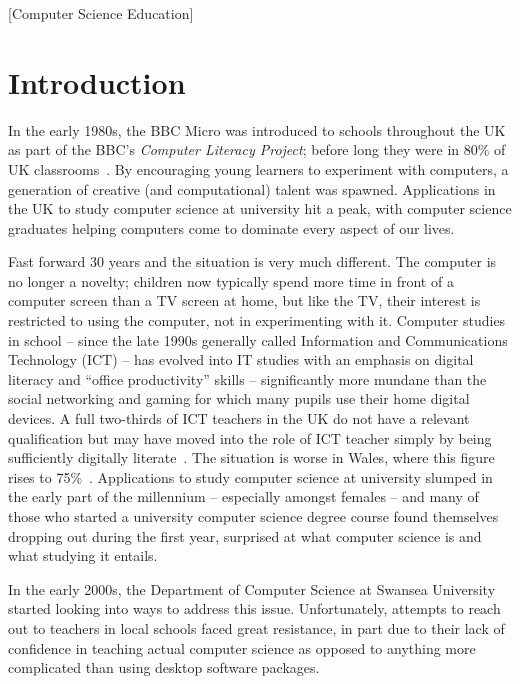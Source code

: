 \documentclass{sig-alternate}
\begin{document}
[Computer Science Education]


\section{Introduction}\label{intro}
In the early 1980s, the BBC Micro was introduced to schools throughout
the UK as part of the BBC's \emph{Computer Literacy Project}; before
long they were in 80\% of UK classrooms~\cite{vasko:1986}. By
encouraging young learners to experiment with computers, a generation
of creative (and computational) talent was spawned. Applications in
the UK to study computer science at university hit a peak, with
computer science graduates helping computers come to dominate every
aspect of our lives.

Fast forward 30 years and the situation is very much different. The
computer is no longer a novelty; children now typically spend more
time in front of a computer screen than a TV screen at home, but like
the TV, their interest is restricted to using the computer, not in
experimenting with it. Computer studies in school -- since the late
1990s generally called Information and Communications Technology (ICT)
-- has evolved into IT studies with an emphasis on digital literacy
and ``office productivity'' skills -- significantly more mundane than
the social networking and gaming for which many pupils use their home
digital devices. A full two-thirds of ICT teachers in the UK do not
have a relevant qualification but may have moved into the role of ICT
teacher simply by being sufficiently digitally
literate~\cite{RoyalSoc:2012}.  The situation is worse in Wales, where
this figure rises to 75\%~\cite{GTCW:2008}. Applications to study
computer science at university slumped in the early part of the
millennium -- especially amongst females -- and many of those who
started a university computer science degree course found themselves
dropping out during the first year, surprised at what computer science
is and what studying it entails.

In the early 2000s, the Department of Computer Science at Swansea
University started looking into ways to address this issue.
Unfortunately, attempts to reach out to teachers in local schools
faced great resistance, in part due to their lack of confidence in
teaching actual computer science as opposed to anything more
complicated than using desktop software packages.
\end{document}

